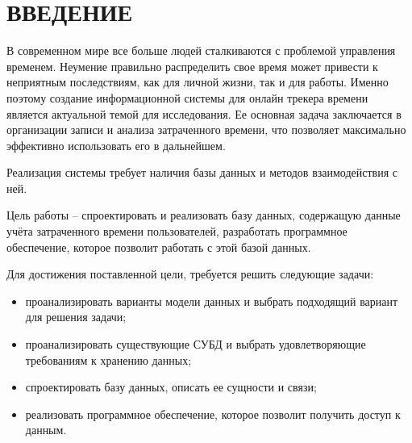 \section*{ВВЕДЕНИЕ}

В современном мире все больше людей сталкиваются с проблемой управления временем. Неумение правильно распределить свое время может привести к неприятным последствиям, как для личной жизни, так и для работы. Именно поэтому создание информационной системы для онлайн трекера времени является актуальной темой для исследования. Ее основная задача заключается в организации записи и анализа затраченного времени, что позволяет максимально эффективно использовать его в дальнейшем. 

Реализация системы требует наличия базы данных и методов взаимодействия с ней.

Цель работы -- спроектировать и реализовать базу данных, содержащую данные учёта затраченного времени пользователей, разработать программное обеспечение, которое позволит работать с этой базой данных.

Для достижения  поставленной цели, требуется решить следующие задачи:
\begin{itemize}[leftmargin=1.6\parindent]
	\item проанализировать варианты модели данных и выбрать подходящий вариант для решения задачи;
	\item проанализировать существующие СУБД и выбрать удовлетворяющие требованиям к хранению данных;
	\item спроектировать базу данных, описать ее сущности и связи;
	\item реализовать программное обеспечение, которое позволит получить доступ к данным.
\end{itemize}
\pagebreak